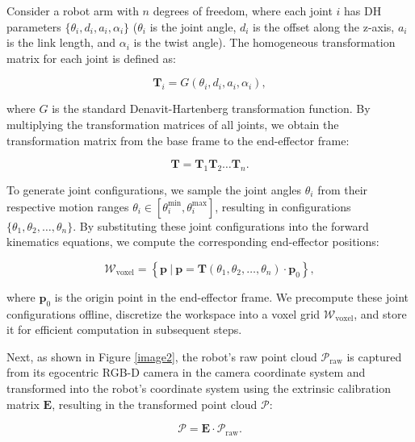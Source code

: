 \documentclass[10pt,twocolumn,letterpaper]{article}
\begin{document}
Consider a robot arm with \(n\) degrees of freedom, where each joint \(i\) has DH parameters \(\{\theta_i, d_i, a_i, \alpha_i\}\) (\(\theta_i\) is the joint angle, \(d_i\) is the offset along the z-axis, \(a_i\) is the link length, and \(\alpha_i\) is the twist angle). The homogeneous transformation matrix for each joint is defined as:

\begin{equation}
\mathbf{T}_i = G(\theta_i, d_i, a_i, \alpha_i),
\end{equation}

where \( G \) is the standard Denavit-Hartenberg transformation function. By multiplying the transformation matrices of all joints, we obtain the transformation matrix from the base frame to the end-effector frame:

\begin{equation}
\mathbf{T} = \mathbf{T}_1 \mathbf{T}_2 \dots \mathbf{T}_n.
\end{equation}

To generate joint configurations, we sample the joint angles \(\theta_i\) from their respective motion ranges \(\theta_i \in [\theta_i^{\text{min}}, \theta_i^{\text{max}}]\), resulting in configurations \(\{\theta_1, \theta_2, \dots, \theta_n\}\). By substituting these joint configurations into the forward kinematics equations, we compute the corresponding end-effector positions:

\begin{equation}
\mathcal{W}_{\text{voxel}} = \left\{ \mathbf{p} \ \bigg| \ \mathbf{p} = \mathbf{T}(\theta_1, \theta_2, \dots, \theta_n) \cdot \mathbf{p}_0 \right\},
\end{equation}

where \(\mathbf{p}_0\) is the origin point in the end-effector frame. We precompute these joint configurations offline, discretize the workspace into a voxel grid \(\mathcal{W}_{\text{voxel}}\), and store it for efficient computation in subsequent steps.

Next, as shown in Figure \ref{image2}, the robot's raw point cloud \(\mathcal{P}_{\text{raw}}\) is captured from its egocentric RGB-D camera in the camera coordinate system and transformed into the robot's coordinate system using the extrinsic calibration matrix \(\mathbf{E}\), resulting in the transformed point cloud \(\mathcal{P}\):

\begin{equation}
\mathcal{P} = \mathbf{E} \cdot \mathcal{P}_{\text{raw}}.
\end{equation}
\end{document}
